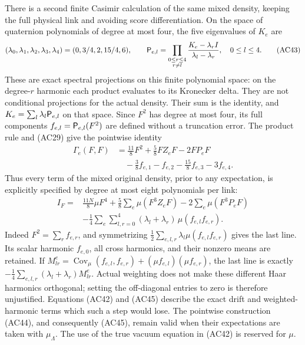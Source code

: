 \documentclass[11pt]{article}
\begin{document}
There is a second finite Casimir calculation of the same mixed density, keeping the full physical link and avoiding score differentiation. On the space of quaternion polynomials of degree at most four, the five eigenvalues of \(K_e\) are
\[
 (\lambda_0,\lambda_1,\lambda_2,\lambda_3,\lambda_4)
       =(0,3/4,2,15/4,6),\qquad
 {\sf P}_{e,l}=
   \prod_{\substack{0\le r\le4\\r\ne l}}
       \frac{K_e-\lambda_r I}{\lambda_l-\lambda_r},
 \quad 0\le l\le4 .
 \tag{AC43}
\]
These are exact spectral projections on this finite polynomial space: on the degree-\(r\) harmonic each product evaluates to its Kronecker delta. They are not conditional projections for the actual density. Their sum is the identity, and \(K_e=\sum_l\lambda_l{\sf P}_{e,l}\) on that space. Since \(F^2\) has degree at most four, its full components \(f_{e,l}={\sf P}_{e,l}(F^2)\) are defined without a truncation error. The product rule and (AC29) give the pointwise identity
\[
 \begin{aligned}
 \Gamma_e(F,F)
 &=\frac{11}{8}F^2+\frac58FZ_eF-2FP_eF\\
 &\quad-\frac38f_{e,1}-f_{e,2}
             -\frac{15}{8}f_{e,3}-3f_{e,4}.
 \end{aligned}\tag{AC44}
\]
Thus every term of the mixed original density, prior to any expectation, is explicitly specified by degree at most eight polynomials per link:
\[
 \begin{aligned}
 I_F={}&\frac{11N}{8}\mu F^4
       +\frac58\sum_e\mu(F^3Z_eF)-2\sum_e\mu(F^3P_eF)\\
 &-\frac14\sum_e\sum_{l,r=0}^4
          (\lambda_l+\lambda_r)\,\mu(f_{e,l}f_{e,r}).
 \end{aligned}\tag{AC45}
\]
Indeed \(F^2=\sum_rf_{e,r}\), and symmetrizing
\(\frac12\sum_{e,l,r}\lambda_l\mu(f_{e,l}f_{e,r})\)
gives the last line. Its scalar harmonic \(f_{e,0}\), all cross harmonics, and their nonzero means are retained. If
\(M^e_{lr}=\operatorname{Cov}_\mu(f_{e,l},f_{e,r})
              +(\mu f_{e,l})(\mu f_{e,r})\),
the last line is exactly \(-\frac14\sum_{e,l,r}(\lambda_l+\lambda_r)M^e_{lr}\).
Actual weighting does not make these different Haar harmonics orthogonal; setting the off-diagonal entries to zero is therefore unjustified. Equations (AC42) and (AC45) describe the exact drift and weighted-harmonic terms which such a step would lose. The pointwise construction (AC44), and consequently (AC45), remain valid when their expectations are taken with \(\mu_\Lambda\). The use of the true vacuum equation in (AC42) is reserved for \(\mu\).
\end{document}
